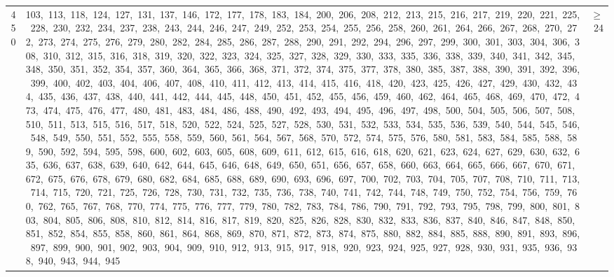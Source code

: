 \begin{longtable}{c|p{}|r}
450 & 103,\ 113,\ 118,\ 124,\ 127,\ 131,\ 137,\ 146,\ 172,\ 177,\ 178,\ 183,\ 184,\ 200,\ 206,\ 208,\ 212,\ 213,\ 215,\ 216,\ 217,\ 219,\ 220,\ 221,\ 225,\ 228,\ 230,\ 232,\ 234,\ 237,\ 238,\ 243,\ 244,\ 246,\ 247,\ 249,\ 252,\ 253,\ 254,\ 255,\ 256,\ 258,\ 260,\ 261,\ 264,\ 266,\ 267,\ 268,\ 270,\ 272,\ 273,\ 274,\ 275,\ 276,\ 279,\ 280,\ 282,\ 284,\ 285,\ 286,\ 287,\ 288,\ 290,\ 291,\ 292,\ 294,\ 296,\ 297,\ 299,\ 300,\ 301,\ 303,\ 304,\ 306,\ 308,\ 310,\ 312,\ 315,\ 316,\ 318,\ 319,\ 320,\ 322,\ 323,\ 324,\ 325,\ 327,\ 328,\ 329,\ 330,\ 333,\ 335,\ 336,\ 338,\ 339,\ 340,\ 341,\ 342,\ 345,\ 348,\ 350,\ 351,\ 352,\ 354,\ 357,\ 360,\ 364,\ 365,\ 366,\ 368,\ 371,\ 372,\ 374,\ 375,\ 377,\ 378,\ 380,\ 385,\ 387,\ 388,\ 390,\ 391,\ 392,\ 396,\ 399,\ 400,\ 402,\ 403,\ 404,\ 406,\ 407,\ 408,\ 410,\ 411,\ 412,\ 413,\ 414,\ 415,\ 416,\ 418,\ 420,\ 423,\ 425,\ 426,\ 427,\ 429,\ 430,\ 432,\ 434,\ 435,\ 436,\ 437,\ 438,\ 440,\ 441,\ 442,\ 444,\ 445,\ 448,\ 450,\ 451,\ 452,\ 455,\ 456,\ 459,\ 460,\ 462,\ 464,\ 465,\ 468,\ 469,\ 470,\ 472,\ 473,\ 474,\ 475,\ 476,\ 477,\ 480,\ 481,\ 483,\ 484,\ 486,\ 488,\ 490,\ 492,\ 493,\ 494,\ 495,\ 496,\ 497,\ 498,\ 500,\ 504,\ 505,\ 506,\ 507,\ 508,\ 510,\ 511,\ 513,\ 515,\ 516,\ 517,\ 518,\ 520,\ 522,\ 524,\ 525,\ 527,\ 528,\ 530,\ 531,\ 532,\ 533,\ 534,\ 535,\ 536,\ 539,\ 540,\ 544,\ 545,\ 546,\ 548,\ 549,\ 550,\ 551,\ 552,\ 555,\ 558,\ 559,\ 560,\ 561,\ 564,\ 567,\ 568,\ 570,\ 572,\ 574,\ 575,\ 576,\ 580,\ 581,\ 583,\ 584,\ 585,\ 588,\ 589,\ 590,\ 592,\ 594,\ 595,\ 598,\ 600,\ 602,\ 603,\ 605,\ 608,\ 609,\ 611,\ 612,\ 615,\ 616,\ 618,\ 620,\ 621,\ 623,\ 624,\ 627,\ 629,\ 630,\ 632,\ 635,\ 636,\ 637,\ 638,\ 639,\ 640,\ 642,\ 644,\ 645,\ 646,\ 648,\ 649,\ 650,\ 651,\ 656,\ 657,\ 658,\ 660,\ 663,\ 664,\ 665,\ 666,\ 667,\ 670,\ 671,\ 672,\ 675,\ 676,\ 678,\ 679,\ 680,\ 682,\ 684,\ 685,\ 688,\ 689,\ 690,\ 693,\ 696,\ 697,\ 700,\ 702,\ 703,\ 704,\ 705,\ 707,\ 708,\ 710,\ 711,\ 713,\ 714,\ 715,\ 720,\ 721,\ 725,\ 726,\ 728,\ 730,\ 731,\ 732,\ 735,\ 736,\ 738,\ 740,\ 741,\ 742,\ 744,\ 748,\ 749,\ 750,\ 752,\ 754,\ 756,\ 759,\ 760,\ 762,\ 765,\ 767,\ 768,\ 770,\ 774,\ 775,\ 776,\ 777,\ 779,\ 780,\ 782,\ 783,\ 784,\ 786,\ 790,\ 791,\ 792,\ 793,\ 795,\ 798,\ 799,\ 800,\ 801,\ 803,\ 804,\ 805,\ 806,\ 808,\ 810,\ 812,\ 814,\ 816,\ 817,\ 819,\ 820,\ 825,\ 826,\ 828,\ 830,\ 832,\ 833,\ 836,\ 837,\ 840,\ 846,\ 847,\ 848,\ 850,\ 851,\ 852,\ 854,\ 855,\ 858,\ 860,\ 861,\ 864,\ 868,\ 869,\ 870,\ 871,\ 872,\ 873,\ 874,\ 875,\ 880,\ 882,\ 884,\ 885,\ 888,\ 890,\ 891,\ 893,\ 896,\ 897,\ 899,\ 900,\ 901,\ 902,\ 903,\ 904,\ 909,\ 910,\ 912,\ 913,\ 915,\ 917,\ 918,\ 920,\ 923,\ 924,\ 925,\ 927,\ 928,\ 930,\ 931,\ 935,\ 936,\ 938,\ 940,\ 943,\ 944,\ 945 & $\ge$ 24 \\

\end{longtable}

